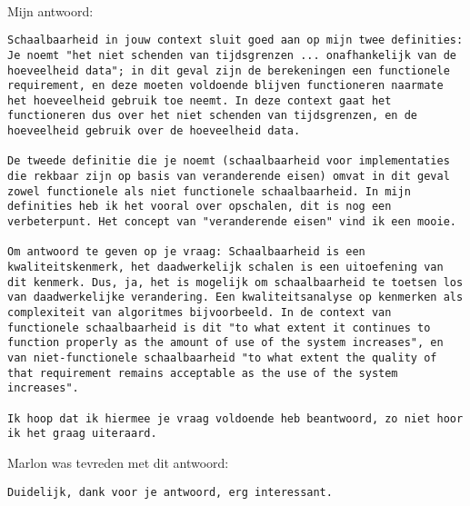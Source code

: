 \\Mijn antwoord:
\begin{verbatim}
Schaalbaarheid in jouw context sluit goed aan op mijn twee definities: Je noemt "het niet schenden van tijdsgrenzen ... onafhankelijk van de hoeveelheid data"; in dit geval zijn de berekeningen een functionele requirement, en deze moeten voldoende blijven functioneren naarmate het hoeveelheid gebruik toe neemt. In deze context gaat het functioneren dus over het niet schenden van tijdsgrenzen, en de hoeveelheid gebruik over de hoeveelheid data.

De tweede definitie die je noemt (schaalbaarheid voor implementaties die rekbaar zijn op basis van veranderende eisen) omvat in dit geval zowel functionele als niet functionele schaalbaarheid. In mijn definities heb ik het vooral over opschalen, dit is nog een verbeterpunt. Het concept van "veranderende eisen" vind ik een mooie.

Om antwoord te geven op je vraag: Schaalbaarheid is een kwaliteitskenmerk, het daadwerkelijk schalen is een uitoefening van dit kenmerk. Dus, ja, het is mogelijk om schaalbaarheid te toetsen los van daadwerkelijke verandering. Een kwaliteitsanalyse op kenmerken als complexiteit van algoritmes bijvoorbeeld. In de context van functionele schaalbaarheid is dit "to what extent it continues to function properly as the amount of use of the system increases", en van niet-functionele schaalbaarheid "to what extent the quality of that requirement remains acceptable as the use of the system increases".

Ik hoop dat ik hiermee je vraag voldoende heb beantwoord, zo niet hoor ik het graag uiteraard.
\end{verbatim}

Marlon was tevreden met dit antwoord:
\begin{verbatim}
Duidelijk, dank voor je antwoord, erg interessant.
\end{verbatim}
